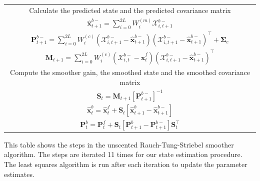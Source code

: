 \documentclass[]{article}
\begin{document}
\begin{table}[!ht]
\begin{tabular}{|c|}
\multicolumn{1}{|p{16cm}|}{Calculate the predicted state and the predicted covariance matrix}\\
$\hat{\mathbf x}_{t+1}^{b-}=\sum_{i=0}^{2L} W_i^{(m)}\mathcal X_{i,t+1}^{b-}$\\
$\mathbf P_{t +1}^{b-}=\sum_{i=0}^{2L} W_i^{(c)}(\mathcal X_{i,t+1}^{b-}-\hat{\mathbf x}_{t +1}^{b-})(\mathcal X_{i,t+1}^{b-}-\hat{\mathbf x}_{t +1}^{b-})^\top+\boldsymbol \Sigma_e $\\
$\mathbf M_{t +1}=\sum_{i=0}^{2L} W_i^{(c)}(\mathcal X_{i,t}^{b-}-\hat{\mathbf x}_{t}^{f})(\mathcal X_{i,t+1}^{b-}-\hat{\mathbf x}_{t+1}^{b-})^\top$\\
\multicolumn{1}{|p{16cm}|}{Compute the smoother gain, the smoothed state and the smoothed covariance matrix}\\
$\mathbf S_t=\mathbf M_{t +1}\left[ \mathbf P_{t +1}^{b-}\right] ^{-1} $\\
$\hat{\mathbf x}_t^b=\hat{\mathbf x}_t^f+\mathbf S_t\left[\hat{\mathbf x}_{t+1}^{b}-\hat{\mathbf x}_{t+1}^{b-}\right]$\\
$\mathbf P_{t}^{b}=\mathbf P_{t}^{f}+\mathbf S_t\left[\mathbf P_{t+1}^{b}-\mathbf P_{t+1}^{b-} \right]\mathbf S_t^\top $\\
\hline
\end{tabular}
\begin{flushleft}This table shows the steps in the unscented Rauch-Tung-Striebel smoother algorithm. The steps are iterated 11 times for our state estimation procedure. The least squares algorithm is run after each iteration to update the parameter estimates.
\end{flushleft}
\label{tab:UKFAlgorithm}
\end{table}
\renewcommand{\arraystretch}{1}



\end{document}
